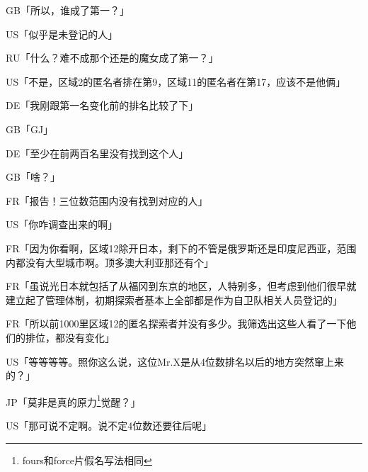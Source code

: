 GB「所以，谁成了第一？」

US「似乎是未登记的人」

RU「什么？难不成那个还是的魔女成了第一？」

US「不是，区域2的匿名者排在第9，区域11的匿名者在第17，应该不是他俩」

DE「我刚跟第一名变化前的排名比较了下」

GB「GJ」

DE「至少在前两百名里没有找到这个人」

GB「啥？」

FR「报告！三位数范围内没有找到对应的人」

US「你咋调查出来的啊」

FR「因为你看啊，区域12除开日本，剩下的不管是俄罗斯还是印度尼西亚，范围内都没有大型城市啊。顶多澳大利亚那还有个」

FR「虽说光日本就包括了从福冈到东京的地区，人特别多，但考虑到他们很早就建立起了管理体制，初期探索者基本上全部都是作为自卫队相关人员登记的」

FR「所以前1000里区域12的匿名探索者并没有多少。我筛选出这些人看了一下他们的排位，都没有变化」

US「等等等等。照你这么说，这位Mr.X是从4位数排名以后的地方突然窜上来的？」

JP「莫非是真的原力\footnote{fours和force片假名写法相同}觉醒？」

US「那可说不定啊。说不定4位数还要往后呢」

